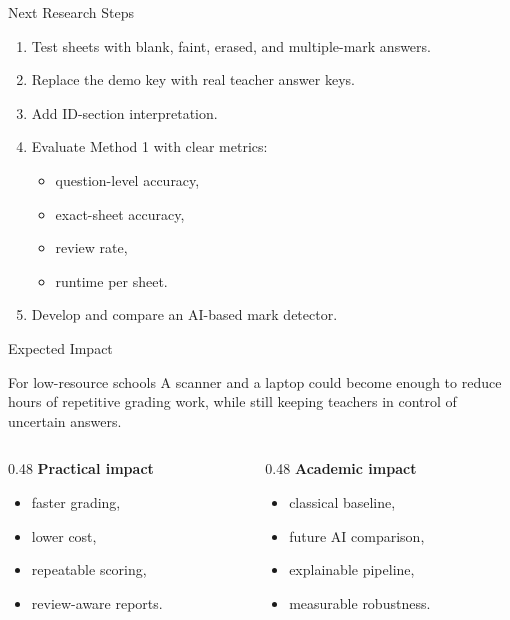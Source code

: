 \documentclass[aspectratio=169]{beamer}
\begin{document}
\begin{frame}{Next Research Steps}
  \begin{enumerate}
    \item Test sheets with blank, faint, erased, and multiple-mark answers.
    \item Replace the demo key with real teacher answer keys.
    \item Add ID-section interpretation.
    \item Evaluate Method 1 with clear metrics:
      \begin{itemize}
        \item question-level accuracy,
        \item exact-sheet accuracy,
        \item review rate,
        \item runtime per sheet.
      \end{itemize}
    \item Develop and compare an AI-based mark detector.
  \end{enumerate}
\end{frame}

\begin{frame}{Expected Impact}
  \begin{block}{For low-resource schools}
    A scanner and a laptop could become enough to reduce hours of repetitive grading work, while still keeping teachers in control of uncertain answers.
  \end{block}

  \vspace{0.2cm}

  \begin{columns}[T]
    \begin{column}{0.48\textwidth}
      \textbf{Practical impact}
      \begin{itemize}
        \item faster grading,
        \item lower cost,
        \item repeatable scoring,
        \item review-aware reports.
      \end{itemize}
    \end{column}
    \begin{column}{0.48\textwidth}
      \textbf{Academic impact}
      \begin{itemize}
        \item classical baseline,
        \item future AI comparison,
        \item explainable pipeline,
        \item measurable robustness.
      \end{itemize}
    \end{column}
  \end{columns}
\end{frame}
\end{document}
